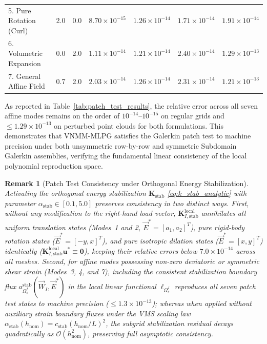 \documentclass[preprint,12pt]{elsarticle}
\newtheorem{remark}{Remark}
\begin{document}
\begin{table}[!t]
{\begin{tabular}{lcccccc}
            5. Pure Rotation (Curl)    & 2.0                                      & 0.0                                 & $8.70 \times 10^{-15}$                                     & $1.26 \times 10^{-14}$                                     & $1.71 \times 10^{-14}$ & $1.91 \times 10^{-14}$ \\
            6. Volumetric Expansion    & 0.0                                      & 2.0                                 & $1.11 \times 10^{-14}$                                     & $1.21 \times 10^{-14}$                                     & $2.40 \times 10^{-14}$ & $1.29 \times 10^{-13}$ \\
            7. General Affine Field    & 0.7                                      & 2.0                                 & $2.03 \times 10^{-14}$                                     & $1.26 \times 10^{-14}$                                     & $2.31 \times 10^{-14}$ & $1.21 \times 10^{-13}$ \\
            \bottomrule
        \end{tabular}
    }
\end{table}

As reported in Table~\ref{tab:patch_test_results}, the relative error across all seven affine modes remains on the order of $10^{-14}\text{--}10^{-15}$ on regular grids and $\le 1.29 \times 10^{-13}$ on perturbed point clouds for both formulations. This demonstrates that VNMM-MLPG satisfies the Galerkin patch test to machine precision under both unsymmetric row-by-row and symmetric Subdomain Galerkin assemblies, verifying the fundamental linear consistency of the local polynomial reproduction space.

\begin{remark}[Patch Test Consistency under Orthogonal Energy Stabilization]
\label{rem:patch_test_stab}
    Activating the orthogonal energy stabilization $\mathbf{K}_{\mathrm{stab}}$ \eqref{eq:k_stab_analytic} with parameter $\alpha_{\mathrm{stab}} \in [0.1, 5.0]$ preserves consistency in two distinct ways. First, without any modification to the right-hand load vector, $\mathbf{K}_{I, \mathrm{stab}}^{\mathrm{local}}$ annihilates all uniform translation states (Modes~1 and 2, $\vec{E}^* = [a_1, a_2]^T$), pure rigid-body rotation states ($\vec{E}^* = [-y, x]^T$), and pure isotropic dilation states ($\vec{E}^* = [x, y]^T$) identically ($\mathbf{K}_{I, \mathrm{stab}}^{\mathrm{local}} \mathbf{u}^* \equiv \mathbf{0}$), keeping their relative errors below $7.0 \times 10^{-14}$ across all meshes. Second, for affine modes possessing non-zero deviatoric or symmetric shear strain (Modes~3, 4, and 7), including the consistent stabilization boundary flux $a_{\Omega_s^I}^{\mathrm{stab}}(\vec{W}_I, \vec{E}^*)$ in the local linear functional $\ell_{\Omega_s^I}$ reproduces all seven patch test states to machine precision ($\le 1.3 \times 10^{-13}$); whereas when applied without auxiliary strain boundary fluxes under the VMS scaling law $\alpha_{\mathrm{stab}}(h_{\mathrm{nom}}) = c_{\mathrm{stab}}(h_{\mathrm{nom}}/L)^2$, the subgrid stabilization residual decays quadratically as $\mathcal{O}(h_{\mathrm{nom}}^2)$, preserving full asymptotic consistency.
\end{remark}
\end{document}
